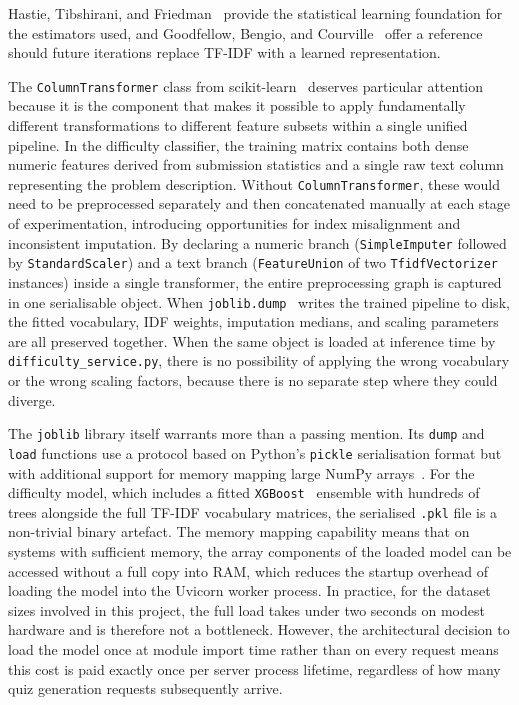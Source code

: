 Hastie, Tibshirani, and Friedman~\cite{hastie2009esl} provide the statistical learning foundation for the estimators used, and Goodfellow, Bengio, and Courville~\cite{goodfellow2016deep} offer a reference should future iterations replace TF-IDF with a learned representation.

The \texttt{ColumnTransformer} class from scikit-learn~\cite{pedregosa2011} deserves particular attention because it is the component that makes it possible to apply fundamentally different transformations to different feature subsets within a single unified pipeline. In the difficulty classifier, the training matrix contains both dense numeric features derived from submission statistics and a single raw text column representing the problem description. Without \texttt{ColumnTransformer}, these would need to be preprocessed separately and then concatenated manually at each stage of experimentation, introducing opportunities for index misalignment and inconsistent imputation. By declaring a numeric branch (\texttt{SimpleImputer} followed by \texttt{StandardScaler}) and a text branch (\texttt{FeatureUnion} of two \texttt{TfidfVectorizer} instances) inside a single transformer, the entire preprocessing graph is captured in one serialisable object. When \texttt{joblib.dump}~\cite{joblib2025} writes the trained pipeline to disk, the fitted vocabulary, IDF weights, imputation medians, and scaling parameters are all preserved together. When the same object is loaded at inference time by \texttt{difficulty\_service.py}, there is no possibility of applying the wrong vocabulary or the wrong scaling factors, because there is no separate step where they could diverge.

The \texttt{joblib} library itself warrants more than a passing mention. Its \texttt{dump} and \texttt{load} functions use a protocol based on Python's \texttt{pickle} serialisation format but with additional support for memory mapping large NumPy arrays~\cite{numpy2020}. For the difficulty model, which includes a fitted \texttt{XGBoost}~\cite{chen2016xgboost} ensemble with hundreds of trees alongside the full TF-IDF vocabulary matrices, the serialised \texttt{.pkl} file is a non-trivial binary artefact. The memory mapping capability means that on systems with sufficient memory, the array components of the loaded model can be accessed without a full copy into RAM, which reduces the startup overhead of loading the model into the Uvicorn worker process. In practice, for the dataset sizes involved in this project, the full load takes under two seconds on modest hardware and is therefore not a bottleneck. However, the architectural decision to load the model once at module import time rather than on every request means this cost is paid exactly once per server process lifetime, regardless of how many quiz generation requests subsequently arrive.

